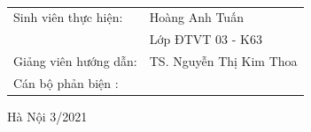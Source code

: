   \begin{center}
       \textbf{\fontsize{20pt}{0pt}\selectfont }\\
       \textbf{\fontsize{20pt}{0pt}\selectfont }
  
  \vspace{1.5cm}
  \begin{table}[H]
       \centering
       \begin{tabular}{l l}
            \fontsize{14pt}{0pt}\selectfont Sinh viên thực hiện:      & \fontsize{14pt}{0pt}\selectfont Hoàng Anh Tuấn \vspace{6pt} \\
            &\fontsize{14pt}{0pt}\selectfont Lớp ĐTVT 03 - K63 \vspace{6pt} \\
            \fontsize{14pt}{0pt}\selectfont Giảng viên hướng dẫn: & \fontsize{14pt}{0pt}\selectfont TS. Nguyễn Thị Kim Thoa  \vspace{6pt} \\
            
            Cán bộ phản biện : &
       \end{tabular}
  \end{table}
  \vspace{2.5cm} %
  \fontsize{14pt}{0pt}\selectfont Hà Nội 3/2021
  \end{center}
  
  \cleardoublepage %
  